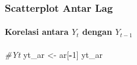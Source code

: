 \documentclass[
]{article}
\newenvironment{Shaded}{\begin{snugshade}}{\end{snugshade}}
\newcommand{\CommentTok}[1]{\textcolor[rgb]{0.56,0.35,0.01}{\textit{#1}}}
\newcommand{\DecValTok}[1]{\textcolor[rgb]{0.00,0.00,0.81}{#1}}
\newcommand{\NormalTok}[1]{#1}
\newcommand{\OtherTok}[1]{\textcolor[rgb]{0.56,0.35,0.01}{#1}}
\newcommand{\SpecialCharTok}[1]{\textcolor[rgb]{0.81,0.36,0.00}{\textbf{#1}}}
\begin{document}
\subsubsection{Scatterplot Antar Lag}\label{scatterplot-antar-lag-1}

\paragraph{\texorpdfstring{Korelasi antara \(Y_t\) dengan
\(Y_{t-1}\)}{Korelasi antara Y\_t dengan Y\_\{t-1\}}}\label{korelasi-antara-y_t-dengan-y_t-1-1}

\begin{Shaded}
\begin{Highlighting}[]
\CommentTok{\#Yt}
\NormalTok{yt\_ar }\OtherTok{\textless{}{-}}\NormalTok{ ar[}\SpecialCharTok{{-}}\DecValTok{1}\NormalTok{]}
\NormalTok{yt\_ar}
\end{Highlighting}
\end{Shaded}
\end{document}
